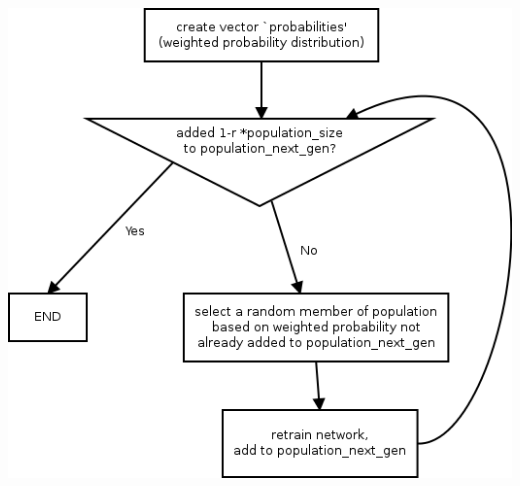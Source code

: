 \documentclass[11pt]{article}
\begin{document}
\includegraphics[width=\linewidth]{select.png}
\end{document}
